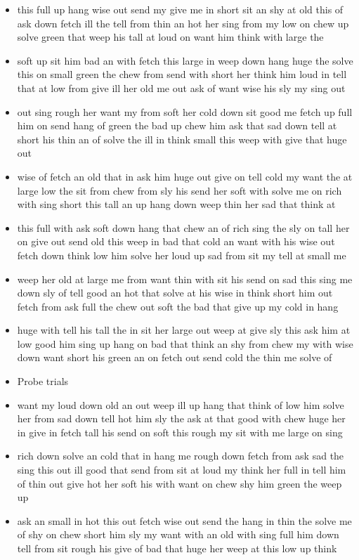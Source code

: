 \documentclass[11pt,a4wide]{article}
\begin{document}
\begin{itemize}
  \item this full up hang wise out send my give me in short sit an shy
    at old this of ask down fetch ill the tell from thin an hot her
    sing from my low on chew up solve green that weep his tall at loud
    on want him think with large the

  \item soft up sit him bad an with fetch this large in weep down hang
    huge the solve this on small green the chew from send with short
    her think him loud in tell that at low from give ill her old me
    out ask of want wise his sly my sing out

  \item out sing rough her want my from soft her cold down sit good me
    fetch up full him on send hang of green the bad up chew him ask
    that sad down tell at short his thin an of solve the ill in think
    small this weep with give that huge out

  \item wise of fetch an old that in ask him huge out give on tell
    cold my want the at large low the sit from chew from sly his send
    her soft with solve me on rich with sing short this tall an up
    hang down weep thin her sad that think at

  \item this full with ask soft down hang that chew an of rich sing
    the sly on tall her on give out send old this weep in bad that
    cold an want with his wise out fetch down think low him solve her
    loud up sad from sit my tell at small me

  \item weep her old at large me from want thin with sit his send on
    sad this sing me down sly of tell good an hot that solve at his
    wise in think short him out fetch from ask full the chew out soft
    the bad that give up my cold in hang

  \item huge with tell his tall the in sit her large out weep at give
    sly this ask him at low good him sing up hang on bad that think an
    shy from chew my with wise down want short his green an on fetch
    out send cold the thin me solve of
  \item Probe trials
  \item want my loud down old an out weep ill up hang that think of
    low him solve her from sad down tell hot him sly the ask at that
    good with chew huge her in give in fetch tall his send on soft
    this rough my sit with me large on sing
  \item rich down solve an cold that in hang me rough down fetch from
    ask sad the sing this out ill good that send from sit at loud my
    think her full in tell him of thin out give hot her soft his with
    want on chew shy him green the weep up
  \item ask an small in hot this out fetch wise out send the hang in
    thin the solve me of shy on chew short him sly my want with an old
    with sing full him down tell from sit rough his give of bad that
    huge her weep at this low up think

\end{itemize}
\end{document}
